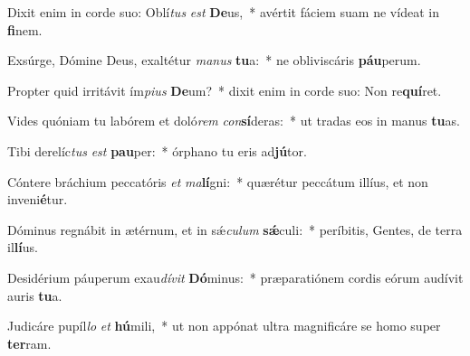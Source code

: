 \item Dixit enim in corde suo: Oblí\textit{tus} \textit{est} \textbf{De}us,~* avértit fáciem suam ne vídeat in \textbf{fi}nem.
\item Exsúrge, Dómine Deus, exaltétur \textit{ma}\textit{nus} \textbf{tu}a:~* ne obliviscáris \textbf{páu}perum.
\item Propter quid irritávit ím\textit{pi}\textit{us} \textbf{De}um?~* dixit enim in corde suo: Non re\textbf{quí}ret.
\item Vides quóniam tu labórem et doló\textit{rem} \textit{con}\textbf{sí}deras:~* ut tradas eos in manus \textbf{tu}as.
\item Tibi derelíc\textit{tus} \textit{est} \textbf{pau}per:~* órphano tu eris ad\textbf{jú}tor.
\item Cóntere bráchium peccatóris \textit{et} \textit{ma}\textbf{lí}gni:~* quærétur peccátum illíus, et non inveni\textbf{é}tur.
\item Dóminus regnábit in ætérnum, et in sǽ\textit{cu}\textit{lum} \textbf{sǽ}culi:~* períbitis, Gentes, de terra il\textbf{lí}us.
\item Desidérium páuperum exau\textit{dí}\textit{vit} \textbf{Dó}minus:~* præparatiónem cordis eórum audívit auris \textbf{tu}a.
\item Judicáre pupíl\textit{lo} \textit{et} \textbf{hú}mili,~* ut non appónat ultra magnificáre se homo super \textbf{ter}ram.
